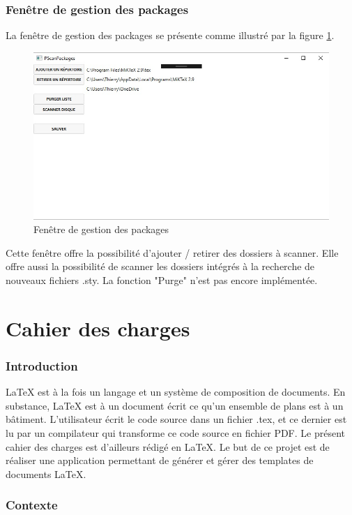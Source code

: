 \documentclass[a4paper, oneside]{article}
\begin{document}
\section{Fenêtre de gestion des packages}
\label{sec:org033edce}
La fenêtre de gestion des packages se présente comme illustré par la
figure \ref{fig:orgd9f5077}.
\begin{figure}[htbp]
\centering
\includegraphics[width=.9\linewidth]{../Images/scan.jpg}
\caption{\label{fig:orgd9f5077}
Fenêtre de gestion des packages}
\end{figure}

Cette fenêtre offre la possibilité d'ajouter / retirer des dossiers à
scanner. Elle offre aussi la possibilité de scanner les dossiers
intégrés à la recherche de nouveaux fichiers .sty. La fonction "Purge"
n'est pas encore implémentée.

\pagebreak
\setcounter{section}{0}
\part{Cahier des charges}


\section{Introduction}
\label{sec:org8fec597}

\LaTeX{} est à la fois un langage et un système de composition de
documents. En substance, \LaTeX{} est à un document écrit ce qu'un
ensemble de plans est à un bâtiment. L'utilisateur écrit le code
source dans un fichier .tex, et ce dernier est lu par un compilateur
qui transforme ce code source en fichier PDF. Le présent cahier des
charges est d'ailleurs rédigé en \LaTeX{}. Le but de ce projet est de
réaliser une application permettant de générer et gérer des templates
de documents \LaTeX{}.

\section{Contexte}
\label{sec:org8c460dd}
\end{document}
